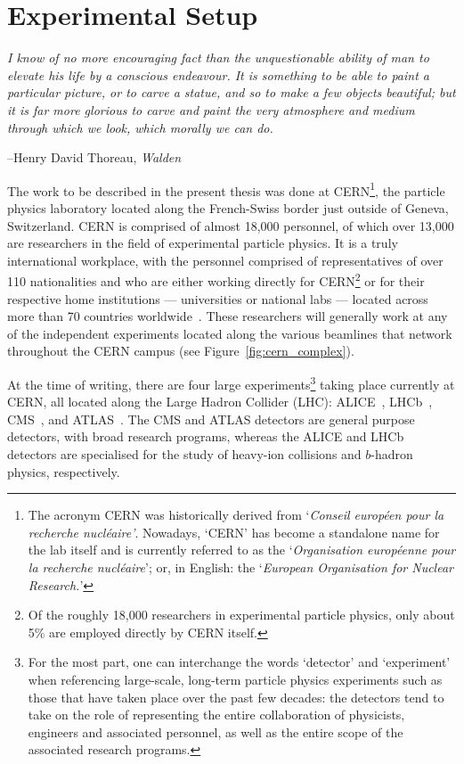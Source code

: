 \chapter{Experimental Setup}

\epigraph{\textit{I know of no more encouraging fact than the unquestionable ability
of man to elevate his life by a conscious endeavour. It is something to be able to paint a particular picture,
or to carve a statue, and so to make a few objects beautiful; but it is far more glorious to carve
and paint the very atmosphere and medium through which we look, which morally we can do.}}{--Henry David Thoreau, \textit{Walden}}

The work to be described in the present thesis was done at CERN\footnote{
The acronym CERN was historically derived from `\textit{Conseil europ{\'e}en pour la recherche
nucl{\'e}aire'}. Nowadays, `CERN' has become a standalone name for the lab itself and
is currently referred to as the `\textit{Organisation europ{\'e}enne pour la recherche nucl{\'e}aire}'; or, in English: the
`\textit{European Organisation for Nuclear Research.}'}, the particle
physics laboratory located along the French-Swiss border just outside of Geneva, Switzerland.
CERN is comprised of almost 18,000 personnel, of which over 13,000 are researchers in the
field of experimental particle physics.
It is a truly international workplace, with the personnel comprised of representatives of over 110 nationalities
and who are either working directly
for CERN\footnote{Of the roughly 18,000 researchers in experimental particle physics, only about
5\% are employed directly by CERN itself.} or for their respective home institutions
--- universities or national labs ---
located across more than 70 countries worldwide~\cite{CERN-HR-STAFF-STAT-2018}.
These researchers will generally work at any of the independent experiments located along the various
beamlines that network throughout the CERN campus (see Figure~\ref{fig:cern_complex}).

At the time of writing, there are four large experiments\footnote{For the most part, one can interchange the
words `detector' and `experiment' when referencing large-scale, long-term particle physics experiments such as those
that have taken place over the past few decades: the detectors tend to take on the role of representing
the entire collaboration of physicists, engineers and associated personnel, as well as the entire scope of the associated
research programs.} taking place currently at CERN, all located along the Large
Hadron Collider (LHC): ALICE~\cite{ALICECollab}, LHCb~\cite{LHCbCollab}, CMS~\cite{CMSCollab},
and ATLAS~\cite{ATLASCollab}. The CMS and ATLAS detectors are general purpose detectors, with broad
research programs, whereas the ALICE and LHCb detectors are specialised for the study of heavy-ion
collisions and $b$-hadron physics, respectively.

